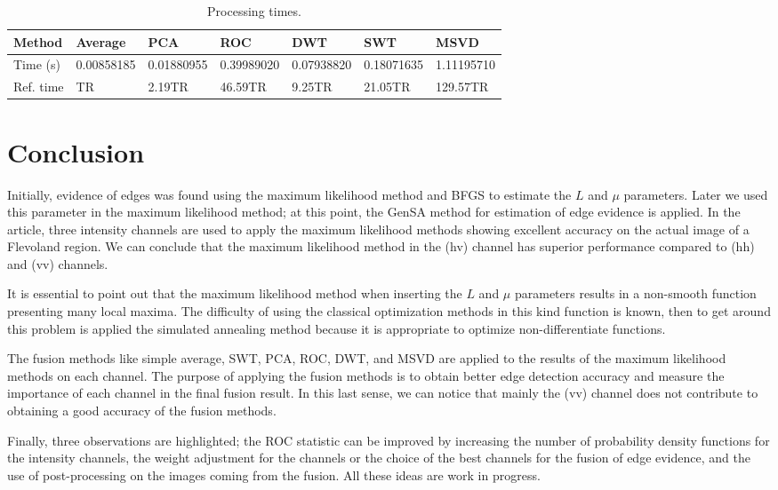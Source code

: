 \documentclass[journal]{IEEEtran}
\begin{document}
\begin{table}[hbt]
	\centering
	\tiny
	\caption{Processing times.}\label{metrica_de_tempo}
\begin{tabular}{@{}lllllll@{}} \toprule
	Method       & Average    &   PCA      &  ROC      & DWT       &  SWT        &  MSVD \\ \midrule
	Time (s)      & 0.00858185 & 0.01880955 &0.39989020 &0.07938820 &  0.18071635 & 1.11195710  \\
    Ref. time     & TR & 2.19TR &46.59TR & 9.25TR   & 21.05TR & 129.57TR  \\ \bottomrule
\end{tabular}
\end{table}


\section{Conclusion}\label{sec_05}

Initially, evidence of edges was found using the maximum likelihood method and BFGS to estimate the $L$ and $\mu$ parameters. Later we used this parameter in the maximum likelihood method; at this point, the GenSA method for estimation of edge evidence is applied. In the article, three intensity channels are used to apply the maximum likelihood methods showing excellent accuracy on the actual image of a Flevoland region. We can conclude that the maximum likelihood method in the (hv) channel has superior performance compared to (hh) and (vv) channels.

It is essential to point out that the maximum likelihood method when inserting the $L$ and $\mu$ parameters results in a non-smooth function presenting many local maxima. The difficulty of using the classical optimization methods in this kind function is known, then to get around this problem is applied the simulated annealing method because it is appropriate to optimize non-differentiate functions.

The fusion methods like simple average, SWT, PCA, ROC, DWT, and MSVD are applied to the results of the maximum likelihood methods on each channel. The purpose of applying the fusion methods is to obtain better edge detection accuracy and measure the importance of each channel in the final fusion result.  In this last sense, we can notice that mainly the (vv) channel does not contribute to obtaining a good accuracy of the fusion methods.

Finally, three observations are highlighted; the ROC statistic can be improved by increasing the number of probability density functions for the intensity channels, the weight adjustment for the channels or the choice of the best channels for the fusion of edge evidence, and the use of post-processing on the images coming from the fusion. All these ideas are work in progress.



\end{document}
